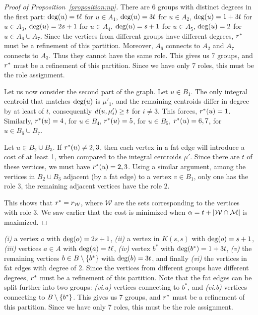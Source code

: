 \begin{proof}[Proof of Proposition~\ref{proposition:np}]
There are 6 groups with distinct degrees in the first part:
$\dg{u} = t\ell$ for $u \in A_1$,
$\dg{u} = 3t$ for $u \in A_2$,
$\dg{u} = 1 + 3t$ for $u \in A_3$,
$\dg{u} = 2s + 1$ for $u \in A_4$,
$\dg{u} = s + 1$ for $u \in A_5$,
$\dg{u} = 2$ for $u \in A_6 \cup A_7$.
Since the vertices from different groups have different degrees, $r^*$
must be a refinement of this partition.
Moreover, $A_6$ connects to $A_2$ and $A_7$ connects to $A_3$.
Thus they cannot have the same role. 
This gives us 7 groups, and $r^*$ must be a refinement of this partition.
Since we have only 7 roles, this must be the role assignment.

Let us now consider the second part of the graph.
Let $u \in B_1$.
The only integral centroid that matches $\dg{u}$ is $\mu'_1$, and the
remaining centroids differ in degree
by at least of $t$, consequently $\dist{u, \mu'_i} \geq t$ for $i \neq 3$.
This forces, $r^*(u) = 1$. Similarly,
$r^*(u) = 4$, for $u \in B_4$, 
$r^*(u) = 5$, for $u \in B_5$,
$r^*(u) = 6, 7$, for $u \in B_6 \cup B_7$.

Let $u \in B_2 \cup B_3$. If $r^*(u) \neq 2, 3$, then each vertex in a fat edge will
introduce a cost of at least 1, when compared to the integral centroids $\mu'$.
Since there are $t$ of these vertices, we must have $r^*(u) = 2, 3$.  Using
a similar argument, among the vertices in $B_2 \cup B_3$ adjacent (by a fat edge) to a vertex $v \in B_1$,
only one has the role $3$, the remaining adjacent vertices have the role $2$.

This shows that $r^* = r_{\mathcal{W}}$, where $\mathcal{W}$ are the sets corresponding
to the vertices with role $3$. We saw earlier that the cost is minimized when $\alpha = t +
{\left|\mathcal{W} \cap \mathcal{M}\right|}$
is maximized.
\end{proof}


\iffalse
\emph{(i)} a vertex $o$ with $\dg{o} = 2s + 1$,
\emph{(ii)} a vertex in $K(s, s)$ with $\dg{o} = s + 1$,
\emph{(iii)} vertices $a \in A$ with $\dg{a} = t\ell$,
\emph{(iv)} vertex $b^*$ with $\dg{b^*} = 1 + 3t$,
\emph{(v)} the remaining vertices $b \in B \setminus \left\{b^*\right\}$ with $\dg{b} = 3t$, and finally
\emph{(vi)} the vertices in fat edges with degree of $2$.
Since the vertices from different groups have different degrees, $r^*$
must be a refinement of this partition. Note that the fat edges can be split further into
two groups:
\emph{(vi.a)} vertices connecting to $b^*$, and
\emph{(vi.b)} vertices connecting to $B \setminus \left\{b^*\right\}$.
This gives us 7 groups, and $r^*$ must be a refinement of this partition.
Since we have only 7 roles, this must be the role assignment.


